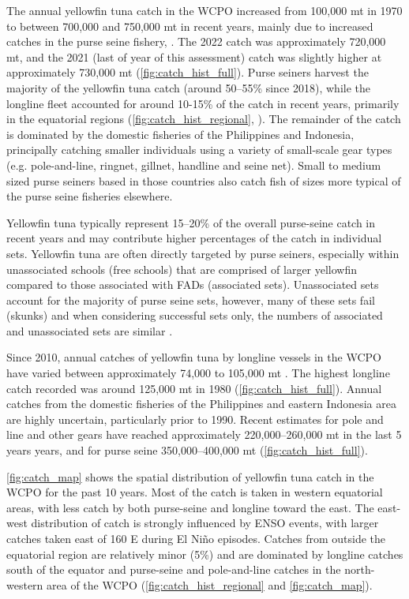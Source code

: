 The annual yellowfin tuna catch in the WCPO increased from 100,000 mt in 1970 to between 700,000 and 750,000 mt in recent years, mainly due to increased catches in the purse seine fishery, \citep{hare_compendium_2023,williams_overview_2023}. The 2022 catch was approximately 720,000 mt, and the 2021 (last of year of this assessment) catch was slightly higher at approximately 730,000 mt (\cref{fig:catch_hist_full}). Purse seiners harvest the majority of the yellowfin tuna catch (around 50--55\% since 2018), while the longline fleet accounted for around 10-15\% of the catch in recent years, primarily in the equatorial regions (\cref{fig:catch_hist_regional}, \citealp{williams_overview_2023}). The remainder of the catch is dominated by the domestic fisheries of the Philippines and Indonesia, principally catching smaller individuals using a variety of small-scale gear types (e.g. pole-and-line, ringnet, gillnet, handline and seine net). Small to medium sized purse seiners based in those countries also catch fish of sizes more typical of the purse seine fisheries elsewhere.

Yellowfin tuna typically represent 15--20\% of the overall purse-seine catch in recent years and may contribute higher percentages of the catch in individual sets. Yellowfin tuna are often directly targeted by purse seiners, especially within unassociated schools (free schools) that are comprised of larger yellowfin compared to those associated with FADs (associated sets). Unassociated sets account for the majority of purse seine sets, however, many of these sets fail (skunks) and when considering successful sets only, the numbers of associated and unassociated sets are similar \citep{hare_western_2022}.

Since 2010, annual catches of yellowfin tuna by longline vessels in the WCPO have varied between approximately 74,000 to 105,000 mt \citep{williams_overview_2023}. The highest longline catch recorded was around 125,000 mt in 1980 (\cref{fig:catch_hist_full}). Annual catches from the domestic fisheries of the Philippines and eastern Indonesia area are highly uncertain, particularly prior to 1990. Recent estimates for pole and line and other gears have reached approximately 220,000--260,000 mt in the last 5 years years, and for purse seine 350,000--400,000 mt (\cref{fig:catch_hist_full}).

\cref{fig:catch_map} shows the spatial distribution of yellowfin tuna catch in the WCPO for the past 10 years. Most of the catch is taken in western equatorial areas, with less catch by both purse-seine and longline toward the east. The east-west distribution of catch is strongly influenced by ENSO events, with larger catches taken east of 160 \degree E during El Ni\~no episodes. Catches from outside the equatorial region are relatively minor (5\%) and are dominated by longline catches south of the equator and purse-seine and pole-and-line catches in the north-western area of the WCPO (\autoref{fig:catch_hist_regional} and \autoref{fig:catch_map}).


